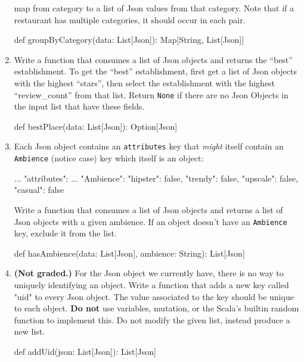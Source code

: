 \documentclass[9pt]{extbook}
\begin{document}
\begin{enumerate}
    map from category to a list of Json values from that category. Note that if
    a restaurant has multiple categories, it should occur in each pair.
    \begin{scalacode}
    def groupByCategory(data: List[Json]): Map[String, List[Json]]
    \end{scalacode}
    \item Write a function that consumes a list of Json objects and returns the
    ``best'' establishment. To get the ``best'' establishment, first get a list
    of Json objects with the highest ``stars'', then select the establishment
    with the highest ``review\_count'' from that list. Return \texttt{None}
    if there are no Json Objects in the input list that have these fields.
    \begin{scalacode}
    def bestPlace(data: List[Json]): Option[Json]
    \end{scalacode}
    \item Each Json object contains an \texttt{attributes} key that
    \textit{might} itself contain an \texttt{Ambience} (notice case) key which
    itself is an object:
    \begin{scalacode}
    {   ...
        "attributes": {
            ...
            "Ambience": {
                "hipster": false,
                "trendy": false,
                "upscale": false,
                "casual": false
            }
        }
    }
    \end{scalacode}
    Write a function that consumes a list of Json objects and returns a list
    of Json objects with a given ambience. If an object doesn't have an
    \texttt{Ambience} key, exclude it from the list.
    \begin{scalacode}
    def hasAmbience(data: List[Json], ambience: String): List[Json]
    \end{scalacode}
    \item \textbf{(Not graded.)} For the Json object we currently have, there
    is no way to uniquely identifying an object. Write a function that adds a
    new key called "uid" to every Json object. The value associated to the
    key should be unique to each object. \textbf{Do not} use variables,
    mutation, or the Scala's builtin random function to implement this. Do not
    modify the given list, instead produce a new list.
    \begin{scalacode}
    def addUid(json: List[Json]): List[Json]
    \end{scalacode}

\end{enumerate}
\end{document}
